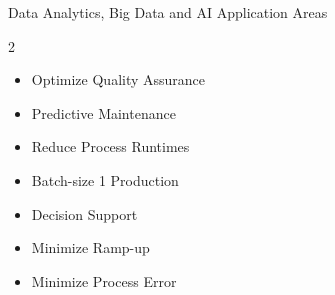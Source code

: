 \begin{v3topic}{Data Analytics, Big Data and AI Application Areas}
        \begin{multicols}{2}
            \begin{itemize}
                \item Optimize Quality Assurance
                \item Predictive Maintenance
                \item Reduce Process Runtimes
                \item Batch-size 1 Production
                \item Decision Support
                \item Minimize Ramp-up
                \item Minimize Process Error
            \end{itemize}
        \end{multicols}

\end{v3topic}
